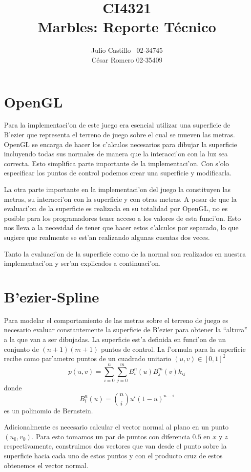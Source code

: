 \documentclass[10pt,letterpaper]{article}
\author{Julio Castillo \ 02-34745\\C\'esar Romero 02-35409}
\title{CI4321\\Marbles: Reporte T\'ecnico}
\begin{document}
\maketitle{}
\section{OpenGL}
Para la implementaci'on de este juego era esencial utilizar una
superficie de B'ezier que representa el terreno de juego sobre el
cual se mueven las metras. OpenGL se encarga de hacer los c'alculos
necesarios para dibujar la superficie incluyendo todas sus normales de
manera que la interacci'on con la luz sea correcta. Esto simplifica
parte importante de la implementaci'on. Con s'olo especificar los
puntos de control podemos crear una superficie y modificarla.

La otra parte importante en la implementaci'on del juego la
constituyen las metras, su interacci'on con la superficie y con otras
metras. A pesar de que la evaluaci'on de la superficie es realizada en
su totalidad por OpenGL, no es posible para los programadores tener
acceso a los valores de esta funci'on. Esto nos lleva a la necesidad
de tener que hacer estos c'alculos por separado, lo que sugiere que
realmente se est'an realizando algunas cuentas dos veces.

Tanto la evaluaci'on de la superficie como de la normal son realizados
en nuestra implementaci'on y ser'an explicados a continuaci'on.

\section{B'ezier-Spline}
Para modelar el comportamiento de las metras sobre el terreno de juego
es necesario evaluar constantemente la superficie de B'ezier para
obtener la ``altura'' a la que van a ser dibujadas. La superficie
est'a definida en funci'on de un conjunto de $(n+1)(m+1)$ puntos de
control. La f'ormula para la superficie~\cite{angel} recibe como par'ametro puntos
de un cuadrado unitario $(u,v) \in [0,1]^2$
\[
p(u,v)=\sum_{i=0}^n\sum_{j=0}^mB_i^n(u)B_j^m(v)k_{ij}
\]
donde
\[
B_i^n(u)={n\choose i}u^i(1-u)^{n-i}
\]
es un polinomio de Bernstein.

Adicionalmente es necesario calcular el vector normal al plano en un
punto $(u_0,v_0)$. Para esto tomamos un par de puntos con diferencia
$0.5$ en $x$ y $z$ respectivamente, construimos dos vectores que van
desde el punto sobre la superficie hacia cada uno de estos puntos y
con el producto cruz de estos obtenemos el vector normal.
\end{document}
